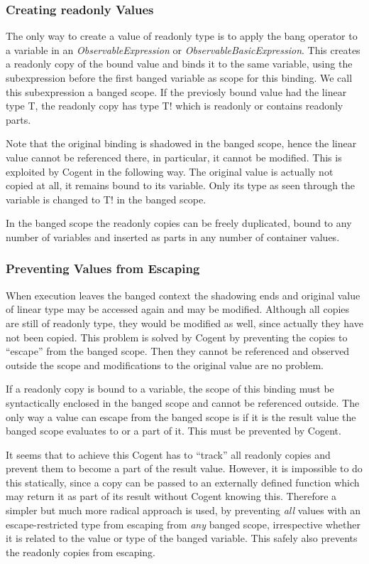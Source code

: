 \documentclass[a4paper]{report}
\newcommand{\cogent}{Cogent\xspace}
\begin{document}
\subsubsection{Creating readonly Values}

The only way to create a value of readonly type is to apply the bang operator to a variable in an
\textit{ObservableExpression} or \textit{ObservableBasicExpression}. This creates a readonly copy of the bound value
and binds it to the same variable, using the subexpression \cbstart before the first banged variable \cbend as scope for this binding. We call this subexpression a
banged scope. If the previosly bound value had the linear type T, the readonly copy has type T! which is readonly or contains
readonly parts.

Note that the original binding is shadowed in the banged scope, hence the linear value cannot be referenced there, 
in particular, it cannot be modified. This is exploited by \cogent in the following way. The original value is 
actually not copied at all, it remains bound to its variable. Only its type as seen through the variable is changed to T!
in the banged scope. 

In the banged scope the readonly copies can be freely duplicated, bound to any number of variables and inserted
as parts in any number of container values.

\subsubsection{Preventing Values from Escaping}

When execution leaves the banged context the shadowing ends and original value of linear type may be accessed again
and may be modified. Although all copies are still of readonly type, they would be modified as well, since actually
they have not been copied. This problem is solved by \cogent by preventing the copies to ``escape'' from the banged 
scope. Then they cannot be referenced and observed outside the scope and modifications to the original value
are no problem.

If a readonly copy is bound to a variable, the scope of this binding must be syntactically enclosed in the banged
scope and cannot be referenced outside. The only way a value can escape from the banged scope is if it is the result
value the banged scope evaluates to or a part of it. This must be prevented by \cogent.

It seems that to achieve this \cogent has to ``track'' all readonly copies and prevent them to become a part of 
the result value. However, it is impossible to do this statically, since a copy can be passed to an externally
defined function which may return it as part of its result without \cogent knowing this. Therefore a simpler
but much more radical approach is used, by preventing \textit{all} values with an escape-restricted type from
escaping from \textit{any} banged scope, irrespective whether it is related to the value or type of the 
banged variable. This safely also prevents the readonly copies from escaping. 
\end{document}
